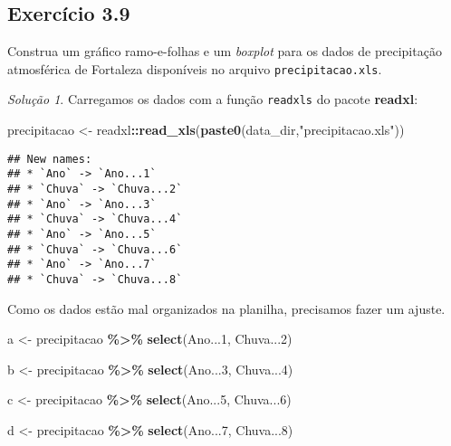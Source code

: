 \documentclass[
]{latex/krantz}
\newenvironment{Shaded}{\begin{snugshade}}{\end{snugshade}}
\newcommand{\DecValTok}[1]{\textcolor[rgb]{0.00,0.00,0.81}{#1}}
\newcommand{\FunctionTok}[1]{\textcolor[rgb]{0.13,0.29,0.53}{\textbf{#1}}}
\newcommand{\NormalTok}[1]{#1}
\newcommand{\OtherTok}[1]{\textcolor[rgb]{0.56,0.35,0.01}{#1}}
\newcommand{\SpecialCharTok}[1]{\textcolor[rgb]{0.81,0.36,0.00}{\textbf{#1}}}
\newcommand{\StringTok}[1]{\textcolor[rgb]{0.31,0.60,0.02}{#1}}
\theoremstyle{definition}
\theoremstyle{definition}
\theoremstyle{definition}
\theoremstyle{definition}
\theoremstyle{remark}
\newtheorem*{solution}{Solução}
\begin{document}
\hypertarget{exr3-9}{%
\subsection*{Exercício 3.9}\label{exr3-9}}

Construa um gráfico ramo-e-folhas e um \emph{boxplot} para os dados de precipitação atmosférica de Fortaleza disponíveis no arquivo \texttt{precipitacao.xls}.

\begin{solution}

Carregamos os dados com a função \texttt{readxls} do pacote \textbf{readxl}:

\begin{Shaded}
\begin{Highlighting}[]
\NormalTok{precipitacao }\OtherTok{\textless{}{-}}\NormalTok{ readxl}\SpecialCharTok{::}\FunctionTok{read\_xls}\NormalTok{(}\FunctionTok{paste0}\NormalTok{(data\_dir,}\StringTok{"precipitacao.xls"}\NormalTok{))}
\end{Highlighting}
\end{Shaded}

\begin{verbatim}
## New names:
## * `Ano` -> `Ano...1`
## * `Chuva` -> `Chuva...2`
## * `Ano` -> `Ano...3`
## * `Chuva` -> `Chuva...4`
## * `Ano` -> `Ano...5`
## * `Chuva` -> `Chuva...6`
## * `Ano` -> `Ano...7`
## * `Chuva` -> `Chuva...8`
\end{verbatim}

Como os dados estão mal organizados na planilha, precisamos fazer um ajuste.

\begin{Shaded}
\begin{Highlighting}[]
\NormalTok{a }\OtherTok{\textless{}{-}}\NormalTok{ precipitacao }\SpecialCharTok{\%\textgreater{}\%}
        \FunctionTok{select}\NormalTok{(Ano...}\DecValTok{1}\NormalTok{, Chuva...}\DecValTok{2}\NormalTok{)}

\NormalTok{b }\OtherTok{\textless{}{-}}\NormalTok{ precipitacao }\SpecialCharTok{\%\textgreater{}\%}
        \FunctionTok{select}\NormalTok{(Ano...}\DecValTok{3}\NormalTok{, Chuva...}\DecValTok{4}\NormalTok{)}

\NormalTok{c }\OtherTok{\textless{}{-}}\NormalTok{ precipitacao }\SpecialCharTok{\%\textgreater{}\%}
        \FunctionTok{select}\NormalTok{(Ano...}\DecValTok{5}\NormalTok{, Chuva...}\DecValTok{6}\NormalTok{)}

\NormalTok{d }\OtherTok{\textless{}{-}}\NormalTok{ precipitacao }\SpecialCharTok{\%\textgreater{}\%}
        \FunctionTok{select}\NormalTok{(Ano...}\DecValTok{7}\NormalTok{, Chuva...}\DecValTok{8}\NormalTok{)}


\end{Highlighting}
\end{Shaded}
\end{solution}
\end{document}
